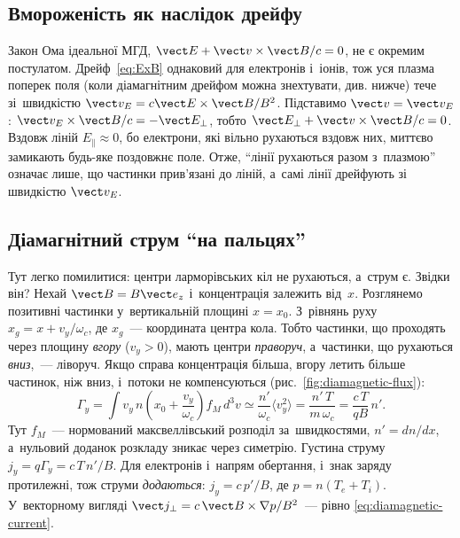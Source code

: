 \subsection*{Вмороженість як наслідок дрейфу}


Закон Ома ідеальної МГД, $\vect E+\vect v\times\vect B/c=0$, не є окремим постулатом.
Дрейф~\eqref{eq:ExB} однаковий для електронів і~іонів, тож уся плазма поперек поля (коли діамагнітним дрейфом можна знехтувати, див. нижче) тече
зі~швидкістю $\vect v_E=c\vect E\times\vect B/B^2$. Підставимо $\vect v=\vect v_E$: $\vect
v_E\times\vect B/c=-\vect E_\perp$, тобто $\vect E_\perp+\vect v\times\vect B/c=0$.
Вздовж ліній $E_\parallel\approx0$, бо електрони, які вільно рухаються вздовж них, миттєво
замикають будь-яке поздовжнє поле. Отже, \enquote{лінії рухаються разом з~плазмою} означає
лише, що частинки прив'язані до ліній, а~самі лінії дрейфують зі швидкістю $\vect v_E$.


\subsection*{Діамагнітний струм \enquote{на пальцях}}


Тут легко помилитися: центри ларморівських кіл не рухаються, а~струм є. Звідки він? Нехай
$\vect B=B\vect e_z$ і~концентрація залежить від~$x$. Розглянемо позитивні частинки
у~вертикальній площині $x=x_0$. З~рівнянь руху $x_g=x+v_y/\omega_c$, де $x_g$~---
координата центра кола. Тобто частинки, що проходять через площину \emph{вгору} ($v_y>0$),
мають центри \emph{праворуч}, а~частинки, що рухаються \emph{вниз},~--- ліворуч. Якщо
справа концентрація більша, вгору летить більше частинок, ніж вниз, і~потоки не
компенсуються (рис.~\ref{fig:diamagnetic-flux}):
\begin{equation*}
	\Gamma_y=\int v_y\,n\!\left(x_0+\frac{v_y}{\omega_c}\right)f_M\,d^3v
	\simeq\frac{n'}{\omega_c}\langle v_y^2\rangle
	=\frac{n'\,T}{m\,\omega_c}
	=\frac{c\,T}{qB}\,n'.
\end{equation*}
Тут $f_M$~--- нормований максвеллівський розподіл за~швидкостями, $n'=dn/dx$, а~нульовий
доданок розкладу зникає через симетрію. Густина струму $j_y=q\Gamma_y=c\,T\,n'/B$. Для електронів і~напрям обертання, і~знак заряду протилежні, тож струми
\emph{додаються}: $j_y=c\,p'/B$, де $p=n(T_e+T_i)$. У~векторному
вигляді $\vect j_\perp=c\,\vect B\times\nabla p/B^2$~--- рівно
\eqref{eq:diamagnetic-current}.

